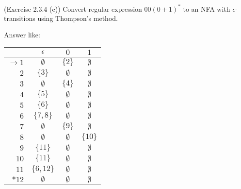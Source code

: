 \documentclass[10pt]{homework}
\begin{document}
\begin{problem} (Exercise 2.3.4 (c)) Convert regular expression $00{(0+1)}^{*}$
  to an NFA with \(\epsilon\)-transitions using Thompson's method.
\end{problem}

\begin{solution}
    Answer like:
  \begin{table}[h]
    \centering
    \begin{tabular}{r||c|c|c} %
      & $\epsilon$ & $0$ & $1$\\\hline\hline %
        $\rightarrow 1$ & $\emptyset$ & $\{2\}$ & $\emptyset$\\
        $2$ & $\{3\}$ & $\emptyset$ & $\emptyset$\\
        $3$ & $\emptyset$ & $\{4\}$ & $\emptyset$\\
        $4$ & $\{5\}$ & $\emptyset$ & $\emptyset$\\
        $5$ & $\{6\}$ & $\emptyset$ & $\emptyset$\\
        $6$ & $\{7,8\}$ & $\emptyset$ & $\emptyset$\\
        $7$ & $\emptyset$ & $\{9\}$ & $\emptyset$\\
        $8$ & $\emptyset$ & $\emptyset$ & $\{10\}$\\
        $9$ & $\{11\}$ & $\emptyset$ & $\emptyset$\\
        $10$ & $\{11\}$ & $\emptyset$ & $\emptyset$\\
        $11$ & $\{6,12\}$ & $\emptyset$ & $\emptyset$\\
        $*12$ & $\emptyset$ & $\emptyset$ & $\emptyset$\\
    \end{tabular}
  \end{table}
\end{solution}
\end{document}
